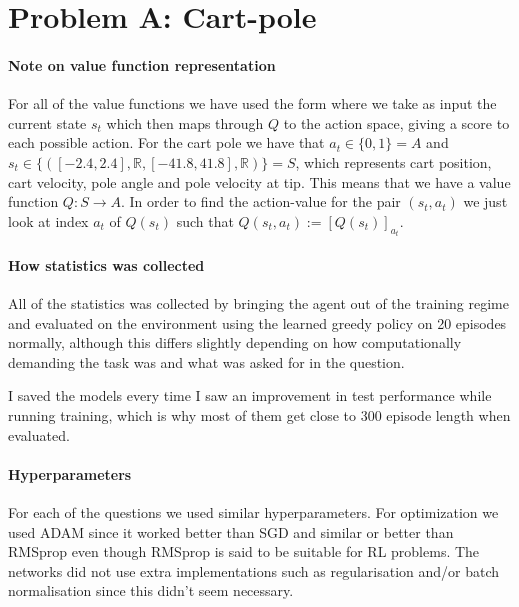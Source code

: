 \documentclass{article}
\begin{document}
\maketitle

\newpage

\tableofcontents

\newpage

\section{Problem A: Cart-pole}

\paragraph{Note on value function representation}

For all of the value functions we have used the form where we take as input the
current state $s_t$ which then maps through $Q$ to the action space, giving a
score to each possible action. For the cart pole we have that $a_t \in \{0, 1\}
= A$ and $s_t \in \{([-2.4, 2.4], \mathbb{R}, [-41.8, 41.8], \mathbb{R})\} = S$,
which represents cart position, cart velocity, pole angle and pole velocity at tip.
This means that we have a value function $Q: S \to A$. In order to find the
action-value for the pair $(s_t, a_t)$ we just look at index $a_t$ of $Q(s_t)$
such that $Q(s_t, a_t) := [Q(s_t)]_{a_t}$.

\paragraph{How statistics was collected}

All of the statistics was collected by bringing the agent out of the training
regime and evaluated on the environment using the learned greedy policy on 20
episodes normally, although this differs slightly depending on how
computationally demanding the task was and what was asked for in the question.

I saved the models every time I saw an improvement in test performance while
running training, which is why most of them get close to 300 episode length when
evaluated.

\paragraph{Hyperparameters}

For each of the questions we used similar hyperparameters. For optimization we
used ADAM since it worked better than SGD and similar or better than RMSprop
even though RMSprop is said to be suitable for RL problems. The networks did not
use extra implementations such as regularisation and/or batch normalisation
since this didn't seem necessary.
\end{document}
